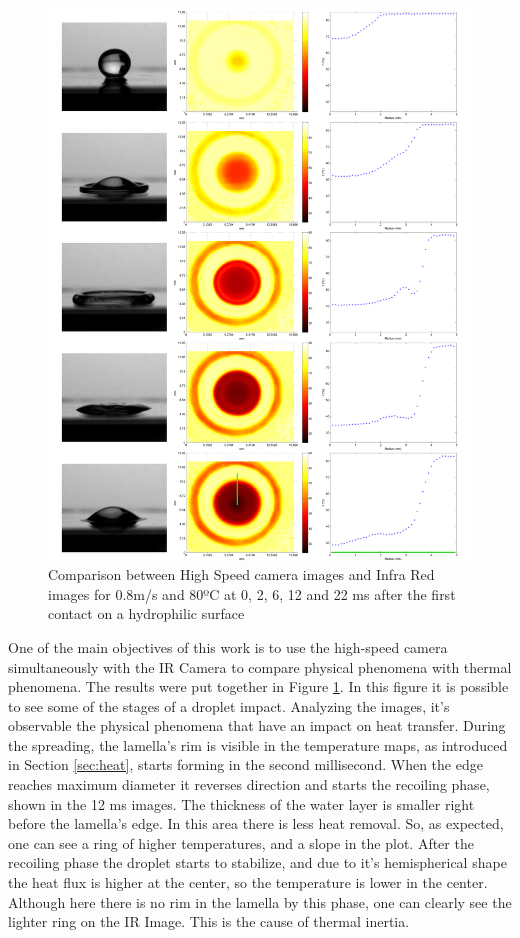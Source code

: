 \begin{figure}
\centering
\includegraphics[width=1\linewidth]{Figures/5.Chapter/IRvsHR.png}
\caption{Comparison between High Speed camera images and Infra Red images for 0.8m/s and 80ºC at 0, 2, 6, 12 and 22 ms after the first contact on a hydrophilic surface}
\label{fig:irvshr}
\end{figure}

\par One of the main objectives of this work is to use the high-speed camera simultaneously with the IR Camera to compare physical phenomena with thermal phenomena. The results were put together in Figure \ref{fig:irvshr}. In this figure it is possible to see some of the stages of a droplet impact. Analyzing the images, it's observable the physical phenomena that have an impact on heat transfer. During the spreading, the lamella's rim is visible in the temperature maps, as introduced in Section \ref{sec:heat}, starts forming in the second millisecond. When the edge reaches maximum diameter it reverses direction and starts the recoiling phase, shown in the 12 ms images. The thickness of the water layer is smaller right before the lamella's edge. In this area there is less heat removal. So, as expected, one can see a ring of higher temperatures, and a slope in the plot. After the recoiling phase the droplet starts to stabilize, and due to it's hemispherical shape the heat flux is higher at the center, so the temperature is lower in the center. Although here there is no rim in the lamella by this phase, one can clearly see the lighter ring on the IR Image. This is the cause of thermal inertia.

